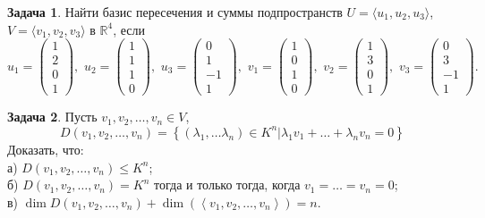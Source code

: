 \documentclass[12pt, fleqn]{extarticle}
\newcommand{\real}{\mathbb{R}}
\theoremstyle{definition}
\newtheorem{problem}{Задача}
\theoremstyle{remark}
\begin{document}
\begin{problem}
Найти базис пересечения и суммы подпространств 
$U=\langle u_1,u_2,u_3\rangle$, $V=\langle v_1,v_2,v_3\rangle$ в $\real^4$, если
$$
u_1=\left(\begin{matrix}
1 \\2\\ 0\\ 1 
\end{matrix}\right),\,\,
u_2=\left(\begin{matrix}
1\\ 1\\ 1\\ 0
\end{matrix}\right),\,\,
u_3=\left(\begin{matrix}
0\\ 1\\ -1\\ 1 
\end{matrix}\right),\,\,
v_1=\left(\begin{matrix}
1\\ 0\\ 1\\  0
\end{matrix}\right),\,\,
v_2=\left(\begin{matrix}
1 \\3 \\0 \\1
\end{matrix}\right),\,\,
v_3=\left(\begin{matrix}
0 \\3 \\-1 \\1
\end{matrix}\right).
$$
\end{problem}

\begin{problem}
Пусть $v_{1}, v_{2}, \ldots, v_{n} \in V$, 
$$D(v_{1}, v_{2}, \ldots, v_{n}) = 
\left\{(\lambda_{1}, \ldots \lambda_{n})\in K^{n} \vert
\lambda_{1}v_{1} + \ldots  + \lambda_{n}v_{n} = 0\right\}$$ 
Доказать, что:\\
а) $D(v_{1}, v_{2}, \ldots, v_{n}) \leqslant K^{n}$;\\
б) $D(v_{1}, v_{2}, \ldots, v_{n}) = K^{n}$ тогда и только тогда, когда 
$v_{1} = \ldots = v_{n} = 0$;\\
в) $\dim D(v_{1}, v_{2}, \ldots, v_{n}) + 
\dim\left(\left\langle v_{1}, v_{2}, \ldots, v_{n} \right\rangle\right) = n$.

\end{problem}
\end{document}
